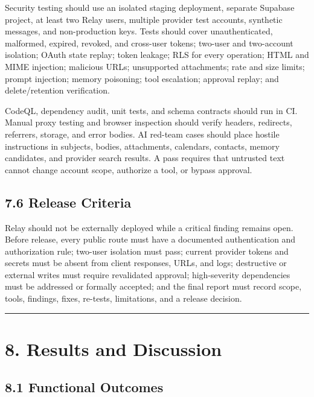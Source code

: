 \documentclass[
]{report}
\begin{document}
Security testing should use an isolated staging deployment, separate
Supabase project, at least two Relay users, multiple provider test
accounts, synthetic messages, and non-production keys. Tests should
cover unauthenticated, malformed, expired, revoked, and cross-user
tokens; two-user and two-account isolation; OAuth state replay; token
leakage; RLS for every operation; HTML and MIME injection; malicious
URLs; unsupported attachments; rate and size limits; prompt injection;
memory poisoning; tool escalation; approval replay; and delete/retention
verification.

CodeQL, dependency audit, unit tests, and schema contracts should run in
CI. Manual proxy testing and browser inspection should verify headers,
redirects, referrers, storage, and error bodies. AI red-team cases
should place hostile instructions in subjects, bodies, attachments,
calendars, contacts, memory candidates, and provider search results. A
pass requires that untrusted text cannot change account scope, authorize
a tool, or bypass approval.

\section{7.6 Release Criteria}\label{76-release-criteria}

Relay should not be externally deployed while a critical finding remains
open. Before release, every public route must have a documented
authentication and authorization rule; two-user isolation must pass;
current provider tokens and secrets must be absent from client
responses, URLs, and logs; destructive or external writes must require
revalidated approval; high-severity dependencies must be addressed or
formally accepted; and the final report must record scope, tools,
findings, fixes, re-tests, limitations, and a release decision.

\begin{center}\rule{0.5\linewidth}{0.5pt}\end{center}

\chapter{8. Results and Discussion}\label{8-results-and-discussion}

\section{8.1 Functional Outcomes}\label{81-functional-outcomes}
\end{document}
